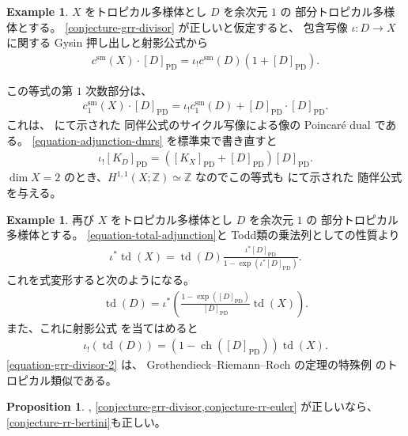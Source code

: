 \documentclass[a4paper,dvipdfmx,reqno,12pt]{amsart}
\theoremstyle{definition}
\newtheorem{example}[theorem]{Example}
\newtheorem{proposition}[theorem]{Proposition}
\newcommand{\opn}[1]{\operatorname{#1}}
\newcommand{\PD}[1]{[#1]_{\mathrm{PD}}}
\numberwithin{equation}{section}
\begin{document}
\begin{example}
     
$X$ をトロピカル多様体とし $D$ を余次元 $1$ の
部分トロピカル多様体とする。
\cref{conjecture-grr-divisor} が正しいと仮定すると、
包含写像
$\iota\colon D\to X$ に関する
Gysin 押し出しと射影公式から
\begin{align}
c^{\mathrm{sm}}(X)\cdot \PD{D}=\iota_!c^{\mathrm{sm}}(D)
(1+\PD{D}).
\end{align}

この等式の第 $1$ 次数部分は、
\begin{align}
\label{equation-adjunction-dmrs}
c^{\mathrm{sm}}_{1}(X)\cdot \PD{D}=\iota_!c^{\mathrm{sm}}_1(D)
+\PD{D}\cdot \PD{D}.
\end{align}
これは、
\cite[Theorem 5.2]{demedrano2023chern}にて示された
同伴公式のサイクル写像による像の
Poincar\'e dual である。
\eqref{equation-adjunction-dmrs} を標準束で書き直すと
\begin{align}
\iota_! \PD{K_D}=(\PD{K_X}+\PD{D})\PD{D}.
\end{align}
$\dim X=2$ のとき、$H^{1,1}(X;\mathbb{Z})\simeq \mathbb{Z}$
なのでこの等式も
\cite[Theorem 4.11]{shaw2015tropical} にて示された
随伴公式を与える。
\end{example}

\begin{example}
再び
$X$ をトロピカル多様体とし $D$ を余次元 $1$ の
部分トロピカル多様体とする。
\eqref{equation-total-adjunction}と
Todd類の乗法列としての性質より
\begin{align}
\iota^{*}\opn{td}(X)=
\opn{td}(D)\frac{\iota^{*}\PD{D}}
{1-\opn{exp}(\iota^{*}\PD{D})}.
\end{align}
これを式変形すると次のようになる。
\begin{align}
\opn{td}(D)
=\iota^{*}\left(
\frac{1-\opn{exp}(\PD{D})}{
\PD{D}}\opn{td}(X)\right).
\end{align}
また、これに射影公式
を当てはめると
\begin{align}
\label{equation-grr-divisor-2}
\iota_!(\opn{td}(D))=(1-\opn{ch}(\PD{D}))\opn{td}(X).
\end{align}
\eqref{equation-grr-divisor-2} は、
Grothendieck--Riemann--Roch の定理の特殊例
のトロピカル類似である。
\end{example}

\begin{proposition}
\label{proposition-euler-to-bertini}
\cite[Conjecture 6.13]{demedrano2023chern},
\cref{conjecture-grr-divisor,conjecture-rr-euler}
が正しいなら、\cref{conjecture-rr-bertini}も正しい。  
\end{proposition}
\end{document}
